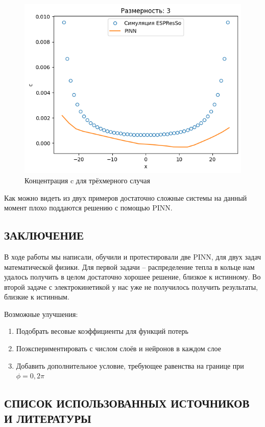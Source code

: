 \documentclass[a4paper,14pt]{extarticle} %
\begin{document}
\begin{figure}[H]
    \center
    \includegraphics[scale=0.5]{../plots/ek/3-dim tanh 20x4.png}
    \caption{Концентрация c для трёхмерного случая}
    \label{fig:3dres}
\end{figure}

Как можно видеть из двух примеров достаточно сложные системы на данный момент плохо поддаются решению с помощью PINN.

\newpage
\FloatBarrier
\newpage
\FloatBarrier
\begin{center}
    \section*{ЗАКЛЮЧЕНИЕ}
\end{center}

В ходе работы мы написали, обучили и протестировали две PINN, для двух задач математической физики. Для первой задачи -- распределение тепла в кольце нам удалось получить в целом достаточно хорошее решение, близкое к истинному. Во второй задаче с электрокинетикой у нас уже не получилось получить результаты, близкие к истинным.

Возможные улучшения:

\begin{enumerate}[label={\arabic*)}]
    \item Подобрать весовые коэффициенты для функций потерь
    \item Поэкспериментировать с числом слоёв и нейронов в каждом слое
    \item Добавить дополнительное условие, требующее равенства на границе при $\phi=0, 2\pi$
\end{enumerate}

\newpage
\begin{center}
    \section*{СПИСОК ИСПОЛЬЗОВАННЫХ ИСТОЧНИКОВ И ЛИТЕРАТУРЫ}
    \label{sec:intro}
\end{center}
\renewcommand{\refname}{}
\vglue-40pt


\end{document}
